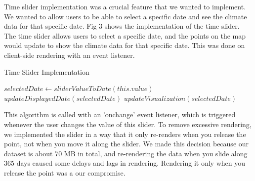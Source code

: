 \documentclass[10pt,twocolumn,twoside]{opticajnl}
\begin{document}
Time slider implementation was a crucial feature that we wanted to implement. We wanted to allow users to be able to select a specific date and see the climate data for that specific date. Fig 3 shows the implementation of the time slider. The time slider allows users to select a specific date, and the points on the map would update to show the climate data for that specific date. This was done on client-side rendering with an event listener.

\begin{algorithm}
    \caption{Time Slider Implementation}
    \begin{algorithmic}[1]
    \State $selectedDate \gets sliderValueToDate(this.value)$
    \State $updateDisplayedDate(selectedDate)$
    \State $updateVisualization(selectedDate)$
    \EndProcedure
    \end{algorithmic}
\end{algorithm}

This algorithm is called with an 'onchange' event listener, which is triggered whenever the user changes the value of this slider. To remove excessive rendering, we implemented the slider in a way that it only re-renders when you release the point, not when you move it along the slider. We made this decision because our dataset is about 70 MB in total, and re-rendering the data when you slide along 365 days caused some delays and lags in rendering. Rendering it only when you release the point was a our compromise.
\end{document}
